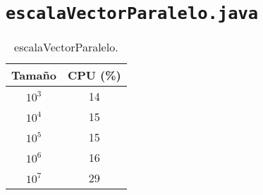\documentclass[12pt,letterpaper]{article}
\begin{document}
\section{\texttt{escalaVectorParalelo.java}}
\begin{center}
	\begin{table}[htbp]
		\begin{center}
			\begin{tabular}{|c|c|}
				\hline
				\textbf{Tamaño} & \textbf{CPU (\%)}  \\
				\hline 
				$10^3$ & 14 \\ \hline
				$10^4$ & 15 \\ \hline
				$10^5$ & 15 \\ \hline	
				$10^6$ & 16 \\ \hline
				$10^7$ & 29 \\ \hline
			\end{tabular}
			\caption{escalaVectorParalelo.}
			\label{tabla:escalaVectorParalelo}
		\end{center}
	\end{table}
\end{center}
\end{document}
